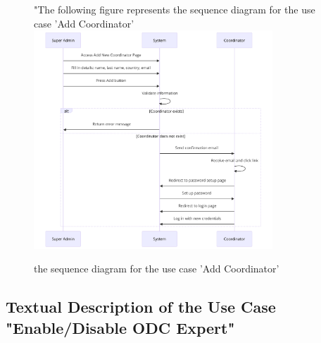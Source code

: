 \begin{figure}[h!]
    \centering
    "The following figure represents the sequence diagram for the use case 'Add Coordinator'\\
    \includegraphics[width=0.8\textwidth]{images/diagram seq2.png}
    \caption{the sequence diagram for the use case 'Add Coordinator'}
    \label{fig:the sequence diagram for the use case 'Add Coordinator'}
\end{figure}
\newpage
\subsection{Textual Description of the Use Case "Enable/Disable ODC Expert"}

